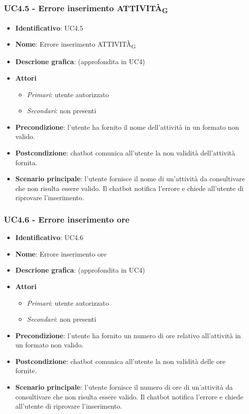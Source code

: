 \subsubsection{UC4.5 - Errore inserimento ATTIVITÀ\textsubscript{G}}
\begin{itemize}
    \item \textbf{Identificativo}: UC4.5
    \item \textbf{Nome}: Errore inserimento ATTIVITÀ\textsubscript{G}
    \item \textbf{Descrione grafica}: (approfondita in UC4)
    \item \textbf{Attori}
        \begin{itemize} 
            \item \textit{Primari}: utente autorizzato
            \item \textit{Secondari}: non presenti
        \end{itemize}
    \item \textbf{Precondizione}: l'utente ha fornito il nome dell'attività in un formato non valido. 
    \item \textbf{Postcondizione}: chatbot comunica all'utente la non validità dell'attività fornita.
    \item \textbf{Scenario principale}: l'utente fornisce il nome di un'attività da consultivare che non risulta essere valido. Il chatbot notifica l'errore e chiede all'utente di riprovare l'inserimento. 
\end{itemize}

\subsubsection{UC4.6 - Errore inserimento ore}
\begin{itemize}
    \item \textbf{Identificativo}: UC4.6
    \item \textbf{Nome}: Errore inserimento ore
    \item \textbf{Descrione grafica}: (approfondita in UC4)
    \item \textbf{Attori}
        \begin{itemize} 
            \item \textit{Primari}: utente autorizzato
            \item \textit{Secondari}: non presenti
        \end{itemize}
    \item \textbf{Precondizione}: l'utente ha fornito un numero di ore relativo all'attività in un formato non valido. 
    \item \textbf{Postcondizione}: chatbot comunica all'utente la non validità delle ore fornite.
    \item \textbf{Scenario principale}: l'utente fornisce il numero di ore di un'attività da consultivare che non risulta essere valido. Il chatbot notifica l'errore e chiede all'utente di riprovare l'inserimento. 
\end{itemize}
\newpage

